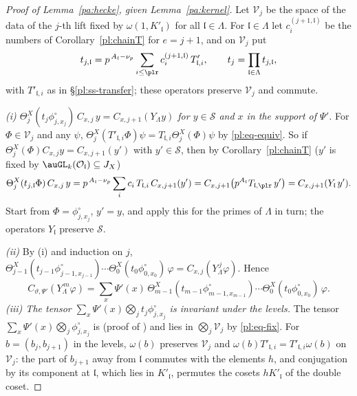 \documentclass[10pt]{amsart}
\theoremstyle{definition}
\theoremstyle{remark}
\providecommand{\auO}{\mathcal O}
\providecommand{\auS}{\mathcal S}
\begin{document}
\begin{proof}[Proof of Lemma~\ref{pa:hecke}, given Lemma~\ref{pa:kernel}]
Let $\mathcal V_j$ be the space of the data of the $j$-th lift fixed by $\omega(1,K'_{\mathfrak
l})$ for all $\mathfrak l\in\Lambda$. For $\mathfrak l\in\Lambda$ let $c^{(j+1,\mathfrak l)}_i$
be the numbers of Corollary~\ref{pl:chainT} for $e=j+1$, and on $\mathcal V_j$ put
\[
t_{j,\mathfrak l}=p^{\,A_{\mathfrak l}-\nu_p}\sum_{i\le\plr}c^{(j+1,\mathfrak l)}_i\,T'_{\mathfrak
l,i},\qquad t_j=\prod_{\mathfrak l\in\Lambda}t_{j,\mathfrak l},
\]
with $T'_{\mathfrak l,i}$ as in \S\ref{pl:ss-transfer}; these operators preserve $\mathcal V_j$
and commute.

\emph{{\rm(i)} $\Theta^X_j(t_j\phi^\circ_{j,x_j})\,C_{x,j}\,y=C_{x,j+1}(Y_\Lambda y)$ for
$y\in\auS$ and $x$ in the support of $\Psi'$.} For $\Phi\in\mathcal V_j$ and any $\psi$,
$\Theta^X_j(T'_{\mathfrak l,i}\Phi)\psi=T_{\mathfrak l,i}\Theta^X_j(\Phi)\psi$ by
\eqref{pl:eq-equiv}. So if $\Theta^X_j(\Phi)C_{x,j}y=C_{x,j+1}(y')$ with $y'\in\auS$, then by
Corollary~\ref{pl:chainT} ($y'$ is fixed by $\auGL_k(\auO_{\mathfrak l})\subseteq J_X$)
\[
\Theta^X_j(t_{j,\mathfrak l}\Phi)\,C_{x,j}\,y=p^{\,A_{\mathfrak l}-\nu_p}\sum_ic_i\,T_{\mathfrak
l,i}\,C_{x,j+1}(y')=C_{x,j+1}\bigl(p^{A_{\mathfrak l}}T_{\mathfrak l,\plr}\,y'\bigr)=C_{x,j+1}
(Y_{\mathfrak l}\,y').
\]
Start from $\Phi=\phi^\circ_{j,x_j}$, $y'=y$, and apply this for the primes of $\Lambda$ in turn;
the operators $Y_{\mathfrak l}$ preserve $\auS$.

\emph{{\rm(ii)}} By (i) and induction on $j$, $\Theta^X_{j-1}(t_{j-1}\phi^\circ_{j-1,x_{j-1}})
\cdots\Theta^X_0(t_0\phi^\circ_{0,x_0})\,\varphi=C_{x,j}(Y_\Lambda^{\,j}\varphi)$. Hence
\[
C_{\vartheta,\Psi'}(Y_\Lambda^{\,m}\varphi)=\sum_x\Psi'(x)\,\Theta^X_{m-1}(t_{m-1}\phi^\circ_{m-1,
x_{m-1}})\cdots\Theta^X_0(t_0\phi^\circ_{0,x_0})\,\varphi .
\]
\emph{{\rm(iii)} The tensor $\sum_x\Psi'(x)\bigotimes_jt_j\phi^\circ_{j,x_j}$ is invariant under
the levels.} The tensor $\sum_x\Psi'(x)\bigotimes_j\phi^\circ_{j,x_j}$ is (proof of
{\cite[Proposition~14.25]{P46}}) and lies in $\bigotimes_j\mathcal V_j$ by \eqref{pl:eq-fix}. For
$b=(b_j,b_{j+1})$ in the levels, $\omega(b)$ preserves $\mathcal V_j$ and $\omega(b)T'_{\mathfrak
l,i}=T'_{\mathfrak l,i}\omega(b)$ on $\mathcal V_j$: the part of $b_{j+1}$ away from $\mathfrak l$
commutes with the elements $h$, and conjugation by its component at $\mathfrak l$, which lies in
$K'_{\mathfrak l}$, permutes the cosets $hK'_{\mathfrak l}$ of the double coset.


\end{proof}
\end{document}
